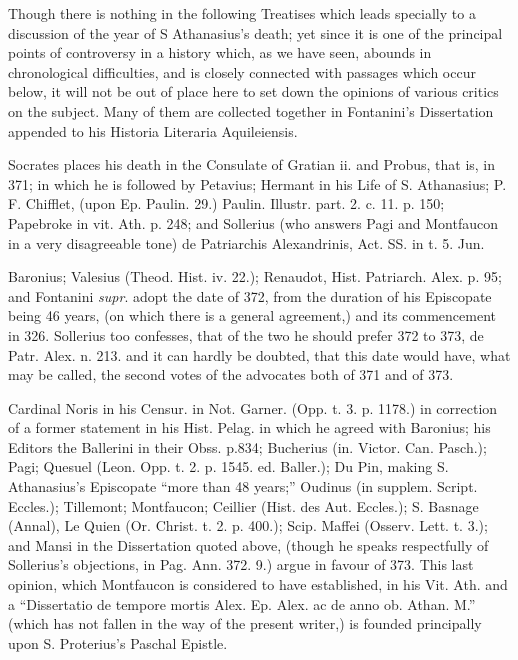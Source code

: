 
Though there is nothing in the
following Treatises which leads specially to a discussion of the year
of S Athanasius's death; yet since it is one of the principal points
of controversy in a history which, as we have seen, abounds in
chronological difficulties, and is closely connected with passages
which occur below, it will not be out of place here to set down the
opinions of various critics on the subject. Many of them are collected
together in Fontanini's Dissertation appended to his Historia
Literaria Aquileiensis.

Socrates places his death in
the Consulate of Gratian ii. and Probus, that is, in 371; in which he
is followed by Petavius; Hermant in his Life of S. Athanasius; P. F.
Chifflet, (upon Ep. Paulin. 29.) Paulin. Illustr. part. 2. c. 11. p.
150; Papebroke in vit. Ath. p. 248; and Sollerius (who answers Pagi
and Montfaucon in a very disagreeable tone) de Patriarchis
Alexandrinis, Act. SS. in t. 5. Jun.

Baronius; Valesius (Theod.
Hist. iv. 22.); Renaudot, Hist. Patriarch. Alex. p. 95; and Fontanini \emph{supr}.
adopt the date of 372, from the duration of his Episcopate being 46
years, (on which there is a general agreement,) and its commencement
in 326. Sollerius too confesses, that of the two he should prefer 372
to 373, de Patr. Alex. n. 213. and it can hardly be doubted, that this
date would have, what may be called, the second votes of the advocates
both of 371 and of 373.

Cardinal Noris in his Censur.
in Not. Garner. (Opp. t. 3. p. 1178.) in correction of a former
statement in his Hist. Pelag. in which he agreed with Baronius; his
Editors the Ballerini in their Obss. p.834; Bucherius (in. Victor.
Can. Pasch.); Pagi; Quesuel (Leon. Opp. t. 2. p. 1545. ed. Baller.);
Du Pin, making S. Athanasius's Episcopate “more than 48 years;”
Oudinus (in supplem. Script. Eccles.); Tillemont; Montfaucon; Ceillier
(Hist. des Aut. Eccles.); S. Basnage (Annal), Le Quien (Or. Christ. t.
2. p. 400.); Scip. Maffei (Osserv. Lett. t. 3.); and Mansi in
the Dissertation quoted above, (though he speaks respectfully of
Sollerius's objections, in Pag. Ann. 372. 9.) argue in favour of 373.
This last opinion, which Montfaucon is considered to have established,
in his Vit. Ath. and a “Dissertatio de tempore mortis Alex. Ep.
Alex. ac de anno ob. Athan. M.” (which has not fallen in the way of
the present writer,) is founded principally upon S. Proterius's
Paschal Epistle.

